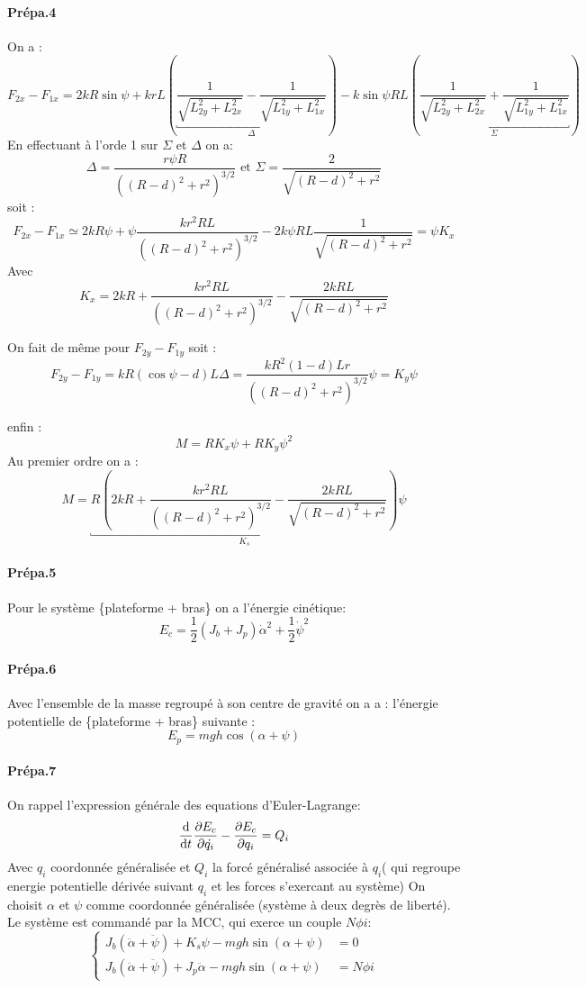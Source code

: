 \documentclass[10pt,a4paper,notitlepage]{article}
\begin{document}
\paragraph{Prépa.4}
On a :
\[
  F_{2x}-F_{1x} = 2kR\sin\psi + krL \left(
   \underbracket{ \frac{1}{\sqrt{L_{2y}^2+L_{2x}^2}}- \frac{1}{\sqrt{L_{1y}^2+L_{1x}^2}}}_{\Delta}
  \right)
  - k\sin\psi RL \left(\underbracket{
    \frac{1}{\sqrt{L_{2y}^2+L_{2x}^2}} + \frac{1}{\sqrt{L_{1y}^2+L_{1x}^2}}
}_{\Sigma}  \right)
\]
En effectuant à l'orde 1 sur $\Sigma$ et $\Delta$ on a:
\[
  \Delta = \frac{r\psi R}{((R-d)^2+r^2)^{3/2}} \text{ et } \Sigma = \frac{2}{\sqrt{(R-d)^2+r^2}}
\]
soit :
\[
  F_{2x}-F_{1x} \simeq 2 k R \psi +  \psi \frac{kr^2RL }{((R-d)^2+r^2)^{3/2}}- 2k\psi RL \frac{1}{\sqrt{(R-d)^2+r^2}} = \psi K_x
\]
Avec
\[
  K_x = 2kR + \frac{kr^2RL}{((R-d)^2+r^2)^{3/2}} -\frac{2kRL}{\sqrt{(R-d)^2+r^2}}
\]

On fait de même pour $F_{2y}-F_{1y}$ soit :
\[
  F_{2y}-F_{1y} = kR(\cos\psi-d)L \Delta = \frac{kR^2(1-d)Lr}{((R-d)^2+r^2)^{3/2}}\psi =K_y \psi
\]

enfin :
\[
  M = RK_x\psi + RK_y\psi^2
\]
Au premier ordre on a :
\[
  M = \underbracket{R \left(2kR + \frac{kr^2RL}{((R-d)^2+r^2)^{3/2}} -\frac{2kRL}{\sqrt{(R-d)^2+r^2}}\right)}_{K_s} \psi
\]
\paragraph{Prépa.5}
Pour le système \{plateforme + bras\} on a l'énergie cinétique:
\[
  E_c= \frac{1}{2}(J_b+J_p)\dot{\alpha}^2+ \frac{1}{2}\dot{\psi}^2
\]

\paragraph{Prépa.6}
Avec l'ensemble de la masse regroupé à son centre de gravité on a a : l'énergie potentielle de \{plateforme + bras\} suivante :
\[
E_p = mgh\cos(\alpha+\psi)
\]
\paragraph{Prépa.7}
On rappel l'expression générale des equations d'Euler-Lagrange:
\[
  \deriv{t}\derivp[E_c]{\dot{q_i}}-\derivp[E_c]{q_i} =Q_i
\]
Avec $q_i $ coordonnée généralisée et $Q_i$ la forcé généralisé associée à $q_i$( qui regroupe energie potentielle dérivée suivant $q_i$ et  les forces s'exercant au système)
On choisit $\alpha$ et $\psi$ comme coordonnée généralisée (système à deux degrès de liberté). Le système est commandé par la MCC, qui exerce un couple $N\phi i$:
\[
  \begin{cases}
    J_b(\ddot{\alpha}+\ddot{\psi})+K_s\psi- mgh \sin(\alpha+\psi) &= 0 \\
    J_b(\ddot{\alpha} + \ddot{\psi})+J_p\ddot{\alpha} -mgh\sin(\alpha+\psi)  &= N\phi i
  \end{cases}
\]
\end{document}
